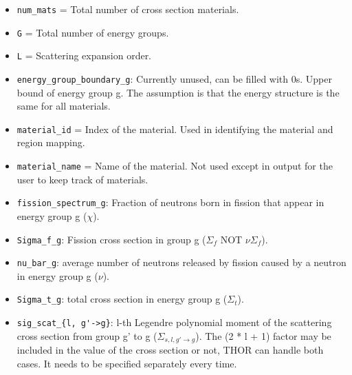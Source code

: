 \begin{itemize}
\item \verb"num_mats" = Total number of cross section materials.
\item \verb"G" = Total number of energy groups.
\item \verb"L" = Scattering expansion order.
\item \verb"energy_group_boundary_g": Currently unused, can be filled with 0s. Upper bound of energy group g. The assumption is that the energy structure is the same for all materials.
\item \verb"material_id" = Index of the material. Used in identifying the material and region mapping.
\item \verb"material_name" = Name of the material. Not used except in output for the user to keep track of materials.
\item \verb"fission_spectrum_g": Fraction of neutrons born in fission that appear in energy group g ($\chi$).
\item \verb"Sigma_f_g": Fission cross section in group g ($\Sigma_f$ NOT $\nu\Sigma_f$).
\item \verb"nu_bar_g": average number of neutrons released by fission caused by a neutron in energy group g ($\nu$).
\item \verb"Sigma_t_g": total cross section in energy group g ($\Sigma_t$).
\item \verb"sig_scat_{l, g'->g}": l-th Legendre polynomial moment of the scattering cross section from group g’ to g ($\Sigma_{s,l,g'\rightarrow g}$). The (2 * l + 1) factor may be included in the value of the cross section or not, THOR can handle both cases. It needs to be specified separately every time.
\end{itemize}